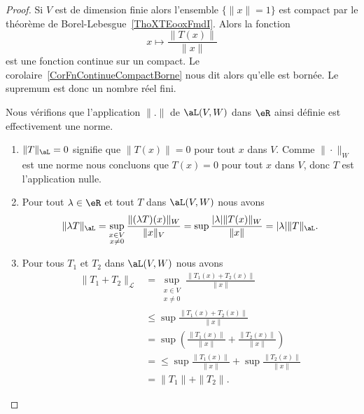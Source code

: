 \begin{proof}
	Si \( V\) est de dimension finie alors l'ensemble \( \{ \| x \|= 1 \}\) est compact par le théorème de Borel-Lebesgue~\ref{ThoXTEooxFmdI}. Alors la fonction
	\begin{equation}
		x\mapsto \frac{ \| T(x) \| }{ \| x \| }
	\end{equation}
	est une fonction continue sur un compact. Le corolaire~\ref{CorFnContinueCompactBorne} nous dit alors qu'elle est bornée. Le supremum est donc un nombre réel fini.

	Nous vérifions que l'application \( \| . \|\) de \( \aL(V,W)\) dans \( \eR\) ainsi définie est effectivement une norme.
	\begin{enumerate}
		\item
		      \( \|T\|_{\aL}=0\) signifie que \( \|T(x)\|=0\) pour tout \( x\) dans \( V\). Comme  \( \|\cdot\|_W\) est une norme nous concluons que \( T(x)=0\) pour tout \( x\) dans \( V\), donc \( T\) est l'application nulle.
		\item
		      Pour tout \( \lambda\in \eR\) et tout  \( T\) dans \( \aL(V,W)\) nous avons
		      \begin{equation}
			      \| \lambda T \|_{\aL}=\sup_{\substack{x\in V\\x\neq 0}}\frac{ \| (\lambda T)(x) \|_W }{ \| x \|_V }=\sup\frac{ | \lambda |\| T(x) \|_W }{ \| x \| }=| \lambda |\| T \|_{\aL}.
		      \end{equation}
		\item
		      Pour tous \( T_1\) et \( T_2\) dans \( \aL(V,W)\) nous avons
		      \begin{subequations}
			      \begin{align}
				      \|T_1+ T_2\|_{\mathcal{L}} & =\sup_{\substack{x\in V                                                               \\x\neq 0}}\frac{ \| T_1(x)+T_2(x) \| }{ \| x \| }\\
				                                 & \leq \sup\frac{ \| T_1(x)+T_2(x) \| }{ \| x \| }                                      \\
				                                 & =\sup\left( \frac{ \| T_1(x) \| }{ \| x \| }+\frac{ \| T_2(x) \| }{ \| x \| } \right) \\
				                                 & =\leq\sup\frac{ \| T_1(x) \| }{ \| x \| }+\sup\frac{ \| T_2(x) \| }{ \| x \| }        \\
				                                 & =\| T_1 \|+\| T_2 \|.
			      \end{align}
		      \end{subequations}
	\end{enumerate}


\end{proof}
